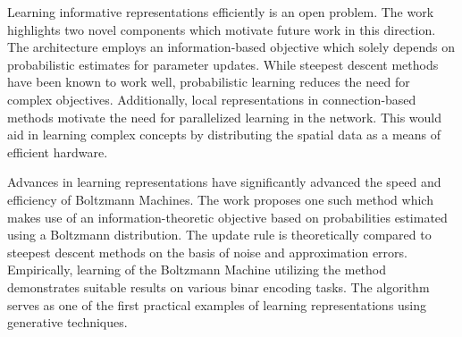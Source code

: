 \documentclass[11pt,letterpaper]{article}
\begin{document}
Learning informative representations efficiently is an open problem. The work highlights two novel components which motivate future work in this direction. The architecture employs an information-based objective which solely depends on probabilistic estimates for parameter updates. While steepest descent methods have been known to work well, probabilistic learning reduces the need for complex objectives. Additionally, local representations in connection-based methods motivate the need for parallelized learning in the network. This would aid in learning complex concepts by distributing the spatial data as a means of efficient hardware. 

Advances in learning representations have significantly advanced the speed and efficiency of Boltzmann Machines. The work proposes one such method which makes use of an information-theoretic objective based on probabilities estimated using a Boltzmann distribution. The update rule is theoretically compared to steepest descent methods on the basis of noise and approximation errors. Empirically, learning of the Boltzmann Machine utilizing the method demonstrates suitable results on various binar encoding tasks. The algorithm serves as one of the first practical examples of learning representations using generative techniques.  
\end{document}
